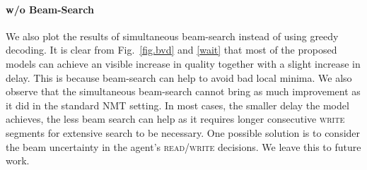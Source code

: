 \paragraph{w/o Beam-Search}
We also plot the results of simultaneous beam-search instead of using greedy decoding. 
It is clear from Fig.~\ref{fig.bvd} and \ref{wait} that most of the proposed models can achieve an visible increase in quality together with a slight increase in delay. 
This is because beam-search can help to avoid bad local minima.  %
We also observe that the simultaneous beam-search cannot bring as much improvement as it did in the standard NMT setting. In most cases, the smaller delay the model achieves, the less beam search can help as it requires longer consecutive \textsc{write} segments for extensive search to be necessary.
One possible solution is to consider the beam uncertainty in the agent's \textsc{read/write} decisions. We leave this to future work. 

